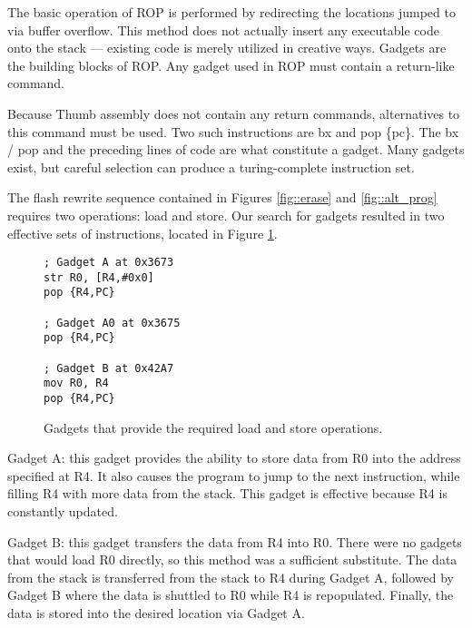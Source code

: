 The basic operation of ROP is performed by redirecting the locations jumped to via buffer overflow. This method does not actually insert any executable code onto the stack --- existing code is merely utilized in creative ways. Gadgets are the building blocks of ROP. Any gadget used in ROP must contain a return-like command. 

Because Thumb assembly does not contain any return commands, alternatives to this command must be used. Two such instructions are bx and pop \{pc\}. The bx / pop and the preceding lines of code are what constitute a gadget. Many gadgets exist, but careful selection can produce a turing-complete instruction set. 

The flash rewrite sequence contained in Figures \ref{fig::erase} and \ref{fig::alt_prog} requires two operations: load and store. Our search for gadgets resulted in two effective sets of instructions, located in Figure \ref{fig::gadget1}. 

	\begin{figure}[htbp]
		\begin{lstlisting}
; Gadget A at 0x3673
str R0, [R4,#0x0]
pop {R4,PC}

; Gadget A0 at 0x3675
pop {R4,PC}

; Gadget B at 0x42A7
mov R0, R4
pop {R4,PC}
		\end{lstlisting}
		\caption{Gadgets that provide the required load and store operations. }\label{fig::gadget1}
	\end{figure}
Gadget A: this gadget provides the ability to store data from R0 into the address specified at R4. It also causes the program to jump to the next instruction, while filling R4 with more data from the stack. This gadget is effective because R4 is constantly updated. 

Gadget B: this gadget transfers the data from R4 into R0. There were no gadgets that would load R0 directly, so this method was a sufficient substitute. The data from the stack is transferred from the stack to R4 during Gadget A, followed by Gadget B where the data is shuttled to R0 while R4 is repopulated. Finally, the data is stored into the desired location via Gadget A. 


